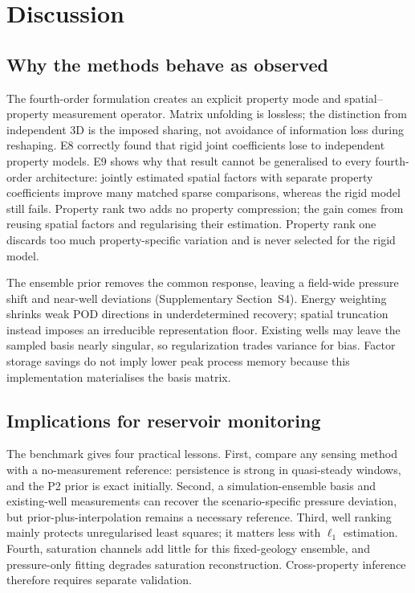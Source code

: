 \section{Discussion}
\label{sec:discussion}

\subsection{Why the methods behave as observed}
The fourth-order formulation creates an explicit property mode and spatial--property measurement operator. Matrix unfolding is lossless; the distinction from independent 3D is the imposed sharing, not avoidance of information loss during reshaping. E8 correctly found that rigid joint coefficients lose to independent property models. E9 shows why that result cannot be generalised to every fourth-order architecture: jointly estimated spatial factors with separate property coefficients improve many matched sparse comparisons, whereas the rigid model still fails. Property rank two adds no property compression; the gain comes from reusing spatial factors and regularising their estimation. Property rank one discards too much property-specific variation and is never selected for the rigid model.

The ensemble prior removes the common response, leaving a field-wide pressure shift and near-well deviations (Supplementary Section~S4). Energy weighting shrinks weak POD directions in underdetermined recovery; spatial truncation instead imposes an irreducible representation floor. Existing wells may leave the sampled basis nearly singular, so regularization trades variance for bias. Factor storage savings do not imply lower peak process memory because this implementation materialises the basis matrix.

\subsection{Implications for reservoir monitoring}
The benchmark gives four practical lessons. First, compare any sensing method with a no-measurement reference: persistence is strong in quasi-steady windows, and the P2 prior is exact initially. Second, a simulation-ensemble basis and existing-well measurements can recover the scenario-specific pressure deviation, but prior-plus-interpolation remains a necessary reference. Third, well ranking mainly protects unregularised least squares; it matters less with $\ell_1$ estimation. Fourth, saturation channels add little for this fixed-geology ensemble, and pressure-only fitting degrades saturation reconstruction. Cross-property inference therefore requires separate validation.


